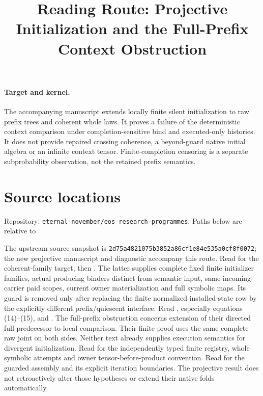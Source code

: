 \documentclass{article}
\title{Reading Route: Projective Initialization and the Full-Prefix Context Obstruction}
\begin{document}
\maketitle
\paragraph{Target and kernel.} The accompanying manuscript extends locally finite silent initialization to raw prefix trees and coherent whole laws. It proves a failure of the deterministic context comparison under completion-sensitive bind and executed-only histories. It does not provide repaired crossing coherence, a beyond-guard native initial algebra or an infinite context tensor. Finite-completion censoring is a separate subprobability observation, not the retained prefix semantics.
\section{Source locations}
Repository: \texttt{eternal-november/eos-research-programmes}. Paths below are relative to
\begin{quote}\small{}\end{quote}
The upstream source snapshot is \texttt{2d75a4821075b3852a86cf1e84e535a0cf8f0072}; the new projective manuscript and diagnostic accompany this route.
Read  for the coherent-family target, then . The latter supplies complete fixed finite initializer families, actual producing binders distinct from semantic input, same-incoming-carrier paid scopes, current owner materialization and full symbolic maps. Its guard is removed only after replacing the finite normalized installed-state row by the explicitly different prefix/quiescent interface.
Read , especially equations (14)--(15), and . The full-prefix obstruction concerns extension of their directed full-predecessor-to-local comparison. Their finite proof uses the same complete raw joint on both sides. Neither text already supplies execution semantics for divergent initialization.
Read  for the independently typed finite registry, whole symbolic attempts and owner tensor-before-product convention. Read  for the guarded assembly and its explicit iteration boundaries. The projective result does not retroactively alter those hypotheses or extend their native folds automatically.
\end{document}
